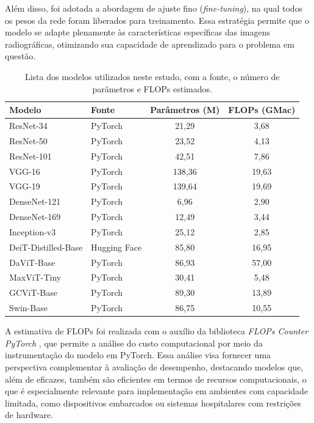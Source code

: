 Além disso, foi adotada a abordagem de ajuste fino (\textit{fine-tuning}), na qual todos os pesos da rede foram liberados para treinamento. Essa estratégia permite que o modelo se adapte plenamente às características específicas das imagens radiográficas, otimizando sua capacidade de aprendizado para o problema em questão.

\begin{table}[!htbp]
    \centering
    \caption{Lista dos modelos utilizados neste estudo, com a fonte, o número de parâmetros e FLOPs estimados.}
    \label{tab:model_list}
    \begin{tabular}{|l|l|c|c|}
        \hline
        \textbf{Modelo} & \textbf{Fonte} & \textbf{Parâmetros (M)} & \textbf{FLOPs (GMac)} \\
        \hline
        ResNet-34 & PyTorch & 21,29 & 3,68 \\
        \hline
        ResNet-50 & PyTorch & 23,52 & 4,13 \\
        \hline
        ResNet-101 & PyTorch & 42,51 & 7,86 \\
        \hline
        VGG-16 & PyTorch & 138,36 & 19,63 \\
        \hline
        VGG-19 & PyTorch & 139,64 & 19,69 \\
        \hline
        DenseNet-121 & PyTorch & 6,96 & 2,90 \\
        \hline
        DenseNet-169 & PyTorch & 12,49 & 3,44 \\
        \hline
        Inception-v3 & PyTorch & 25,12 & 2,85 \\
        \hline
        DeiT-Distilled-Base & Hugging Face & 85,80 & 16,95 \\
        \hline
        DaViT-Base & PyTorch & 86,93 & 57,00 \\
        \hline
        MaxViT-Tiny & PyTorch & 30,41 & 5,48 \\
        \hline
        GCViT-Base & PyTorch & 89,30 & 13,89 \\
        \hline
        Swin-Base & PyTorch & 86,75 & 10,55 \\
        \hline
    \end{tabular}
\end{table}

A estimativa de FLOPs foi realizada com o auxílio da biblioteca \textit{FLOPs Counter PyTorch} \cite{ptflops}, que permite a análise do custo computacional por meio da instrumentação do modelo em PyTorch. Essa análise visa fornecer uma perspectiva complementar à avaliação de desempenho, destacando modelos que, além de eficazes, também são eficientes em termos de recursos computacionais, o que é especialmente relevante para implementação em ambientes com capacidade limitada, como dispositivos embarcados ou sistemas hospitalares com restrições de hardware.

